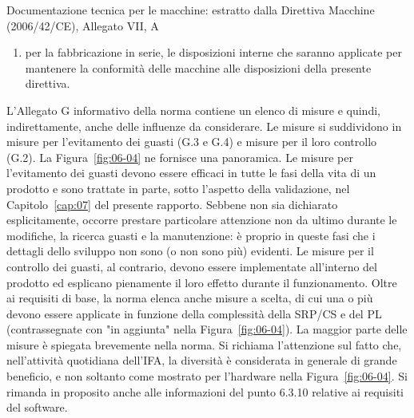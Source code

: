 \begin{riquadro}[label=box:06-2]{Documentazione tecnica per le macchine: estratto dalla Direttiva Macchine (2006/42/CE), Allegato VII, A}
\begin{enumerate}[label=\arabic*., leftmargin=1.5em, itemsep=0pt, parsep=0pt, topsep=0pt]
\begin{enumerate}[label=\alph*), leftmargin=1.5em, itemsep=0pt, parsep=0pt, topsep=0pt]
\begin{itemize}[label=---, leftmargin=1.8em, itemsep=0pt, parsep=0pt, topsep=0pt]
            \item da un esemplare delle istruzioni della macchina,
            \item se del caso, dalla dichiarazione di incorporazione per le quasi-macchine incluse e dalle relative istruzioni di assemblaggio,
            \item se del caso, dalle copie della dichiarazione CE di conformità delle macchine o di altri prodotti incorporati nella macchina,
            \item da una copia della dichiarazione CE di conformità.
        \end{itemize}
        \item per la fabbricazione in serie, le disposizioni interne che saranno applicate per mantenere la conformità delle macchine alle disposizioni della presente direttiva.
    \end{enumerate}
\end{enumerate}
\end{riquadro}

L'Allegato G informativo della norma contiene un elenco di misure e quindi, indirettamente, anche delle influenze da considerare. Le misure si suddividono in misure per l'evitamento dei guasti (G.3 e G.4) e misure per il loro controllo (G.2). La Figura~\ref{fig:06-04} ne fornisce una panoramica. Le misure per l'evitamento dei guasti devono essere efficaci in tutte le fasi della vita di un prodotto e sono trattate in parte, sotto l'aspetto della validazione, nel Capitolo~\ref{cap:07} del presente rapporto. Sebbene non sia dichiarato esplicitamente, occorre prestare particolare attenzione non da ultimo durante le modifiche, la ricerca guasti e la manutenzione: è proprio in queste fasi che i dettagli dello sviluppo non sono (o non sono più) evidenti. Le misure per il controllo dei guasti, al contrario, devono essere implementate all'interno del prodotto ed esplicano pienamente il loro effetto durante il funzionamento. Oltre ai requisiti di base, la norma elenca anche misure a scelta, di cui una o più devono essere applicate in funzione della complessità della SRP/CS e del PL (contrassegnate con "in aggiunta" nella Figura~\ref{fig:06-04}).
La maggior parte delle misure è spiegata brevemente nella norma. Si richiama l'attenzione sul fatto che, nell'attività quotidiana dell'IFA, la diversità è considerata in generale di grande beneficio, e non soltanto come mostrato per l'hardware nella Figura~\ref{fig:06-04}. Si rimanda in proposito anche alle informazioni del punto 6.3.10 relative ai requisiti del software.

